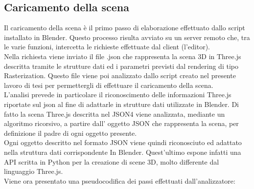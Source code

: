\subsection{Caricamento della scena}
Il caricamento della scena è il primo passo di elaborazione effettuato dallo script installato in Blender. Questo processo risulta avviato su un server remoto che, tra le varie funzioni, intercetta le richieste effettuate dal client (l’editor).
\\
Nella richiesta viene inviato il file .json che rappresenta la scena 3D in Three.js descritta tramite le strutture dati ed i parametri previsti dal rendering di tipo Rasterization.
Questo file viene poi analizzato dallo script creato nel presente lavoro di tesi per permettergli di effettuare il caricamento della scena.
\\
L’analisi prevede in particolare il riconoscimento  delle informazioni Three.js riportate sul json al fine di adattarle in strutture dati utilizzate in Blender.
Di fatto la scena Three.js descritta nel JSON4 viene analizzata, mediante un algoritmo ricorsivo, a partire dall’ oggetto JSON che rappresenta la scena, per definizione il padre di ogni oggetto presente.
\\
Ogni oggetto descritto nel formato JSON viene quindi riconosciuto ed adattato nella struttura dati corrispondente In Blender. Quest’ultimo espone infatti una API scritta in Python per la creazione di scene 3D, molto differente dal linguaggio Three.js.
\\
Viene ora presentato una pseudocodifica dei passi effettuati dall’analizzatore:





